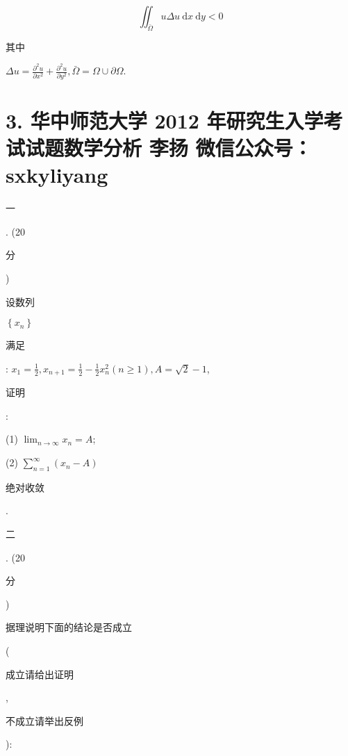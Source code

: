 \documentclass[10pt]{article}
\begin{document}
$$
\iint_{\bar{\Omega}} u \Delta u \mathrm{~d} x \mathrm{~d} y<0
$$
\begin{CJK}{UTF8}{mj}其中\end{CJK} $\Delta u=\frac{\partial^{2} u}{\partial x^{2}}+\frac{\partial^{2} u}{\partial y^{2}}, \bar{\Omega}=\Omega \cup \partial \Omega$.

\section{3. 华中师范大学 2012 年研究生入学考试试题数学分析 
 李扬 
 微信公众号：sxkyliyang}
\begin{CJK}{UTF8}{mj}一\end{CJK}. (20 \begin{CJK}{UTF8}{mj}分\end{CJK}) \begin{CJK}{UTF8}{mj}设数列\end{CJK} $\left\{x_{n}\right\}$ \begin{CJK}{UTF8}{mj}满足\end{CJK}: $x_{1}=\frac{1}{2}, x_{n+1}=\frac{1}{2}-\frac{1}{2} x_{n}^{2}(n \geqslant 1), A=\sqrt{2}-1$, \begin{CJK}{UTF8}{mj}证明\end{CJK}:

(1) $\lim _{n \rightarrow \infty} x_{n}=A$;

(2) $\sum_{n=1}^{\infty}\left(x_{n}-A\right)$ \begin{CJK}{UTF8}{mj}绝对收敛\end{CJK}.

\begin{CJK}{UTF8}{mj}二\end{CJK}. (20 \begin{CJK}{UTF8}{mj}分\end{CJK}) \begin{CJK}{UTF8}{mj}据理说明下面的结论是否成立\end{CJK} (\begin{CJK}{UTF8}{mj}成立请给出证明\end{CJK}, \begin{CJK}{UTF8}{mj}不成立请举出反例\end{CJK}):
\end{document}
